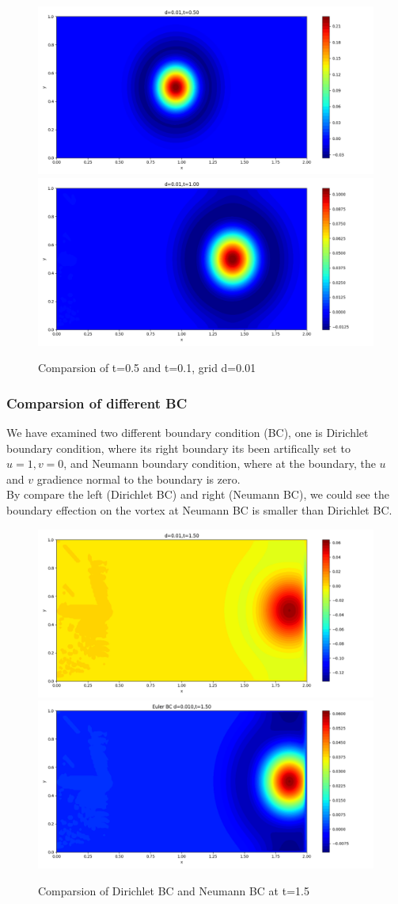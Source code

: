 \documentclass[12pt]{article}
\begin{document}
\begin{figure}[H]
    \centering
    \includegraphics[width=0.48\linewidth]{figures/3d0.01t0.50.png}
    \includegraphics[width=0.48\linewidth]{figures/3d0.01t1.00.png}
    \label{IGs.jpg}
    \caption{Comparsion of t=0.5 and t=0.1, grid d=0.01}
\end{figure}




\subsubsection{Comparsion of different BC}

We have examined two different boundary condition (BC), one 
is Dirichlet boundary condition, where its right boundary its 
been artifically set to $u=1, v=0$, and Neumann boundary condition,
where at the boundary, the $u$ and $v$ gradience normal to the 
boundary is zero.\\

By compare the left (Dirichlet BC) and right (Neumann BC), 
we could see the boundary effection on the vortex at Neumann
BC is smaller than Dirichlet BC.


\begin{figure}[H]
    \centering
    \includegraphics[width=0.48\linewidth]{figures/3d0.01t1.50.png}
    \includegraphics[width=0.48\linewidth]{figures/3Ed0.010t1.50.png}
    \label{IGs.jpg}
    \caption{Comparsion of Dirichlet BC and Neumann BC at t=1.5}
\end{figure}
\end{document}

